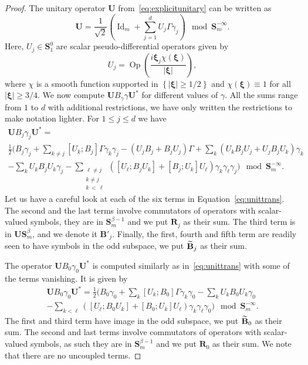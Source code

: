 \documentclass[10pt]{amsart}
\theoremstyle{definition}\newtheorem{defi}[theo]{Definition}\newtheorem{rema}[theo]{Remark}\newtheorem{exam}[theo]{Example}\newtheorem{nota}[theo]{Notation}
\DeclareMathOperator{\Op}{Op}
\DeclareMathOperator{\Id}{Id}
\newcommand{\bxi}{\boldsymbol \xi}
\newcommand{\BB}{\mathbf B}
\newcommand{\BS}{\mathbf S}
\newcommand{\BR}{\mathbf R}
\newcommand{\BU}{\mathbf U}
\newcommand{\abs}[1]{\left\lvert #1 \right\rvert}
\newcommand{\set}[1]{\left\{ #1 \right\}}
\let\oldtilde\tilde
\renewcommand*{\tilde}[1]{\mathchoice{\widetilde{#1}}{\widetilde{#1}}{\oldtilde{#1}}{\oldtilde{#1}}}
\begin{document}
\begin{proof}
The unitary operator $\BU$ from~\eqref{eq:explicitunitary} can be written as
\begin{equation}
\BU = \frac{1}{\sqrt 2} \left(\Id_m + \sum_{j=1}^d U_j \Gamma \gamma_j\right)
\mod \BS_m^{-\infty}.\label{eq:Udecomposed}
\end{equation}
Here, $U_j \in \BS_1^0$ are scalar pseudo-differential operators given by
\begin{equation}
U_j = \Op\left(\frac{i \bxi_j \chi(\bxi)}{\abs \bxi}\right),
\end{equation}
where $\chi$ is a smooth function supported in $\set{\abs{\bxi} \ge 1/2}$ and $\chi(\bxi) \equiv 1$ for all $\abs \bxi \ge 3/4$. We now compute $\BU B_\gamma \gamma \BU^*$ for different values of $\gamma$. All the sums range from $1$ to $d$ with additional restrictions, we have only written the restrictions to make notation lighter. For $1 \le j \le d$ we have
\begin{multline}\label{eq:unittrans}
\BU B_{j} \gamma_j \BU^*=\\
 \frac{1}{2}\Bigg(B_{j} \gamma_j + \sum_{k
\neq j}[U_k;B_{j}]\Gamma \gamma_k \gamma_j - \left(U_j B_{j} + B_{j} U_j\right) \Gamma + \sum_{k} \left(U_k B_{j} U_j + U_j B_j U_k\right) \gamma_k \\
- \sum_{k} U_k B_{j} U_k \gamma_j -
\sum_{\substack{\ell \neq j \\ k \neq j \\k\,<\,\ell}}\left([U_\ell;B_{j} U_k] + [B_{j};U_k]U_\ell \right) \gamma_k \gamma_\ell
\gamma_j
\bigg) \mod \BS_m^{- \infty}.
\end{multline}
Let us have a careful look at each of the six terms in Equation~\eqref{eq:unittrans}. The second and the last terms involve commutators of operators with scalar-valued symbols, they are in $\BS_m^{\beta - 1}$ and we put $\BR_{j}$ as their sum. The third term is in $\BU\BS^\beta_m$, and we denote it $\BB'_j$. Finally, the first, fourth and fifth term are readily seen to have symbols in the odd subspace, we put $\tilde \BB_{j}$ as their sum.

The operator $\BU B_{0} \gamma_0 \BU^*$ is computed similarly as in~\eqref{eq:unittrans} with some of the terms vanishing. It is given by
\begin{multline}
\BU B_0 \gamma_0 \BU^* =
\frac 1 2 \Bigg(B_0 \gamma_0 + \sum_{k} [U_k;B_0]
\Gamma \gamma_k \gamma_0 - \sum_k U_k B_0 U_k \gamma_0  \\- \sum_{k<\ell} ([U_\ell;B_0 U_k] + [B_0;U_k]U_\ell) \gamma_k \gamma_\ell \gamma_0\Bigg) \mod
\BS_m^{-\infty}.
\end{multline}
The first and third term have image in the odd subspace, we put $\tilde
\BB_0$ as their sum. The second and last terms involve commutators of operators with scalar-valued symbols, as such they are in $\BS_m^{\beta - 1}$ and we put $\BR_0$ as their sum. We note that there are no uncoupled terms.


\end{proof}
\end{document}
